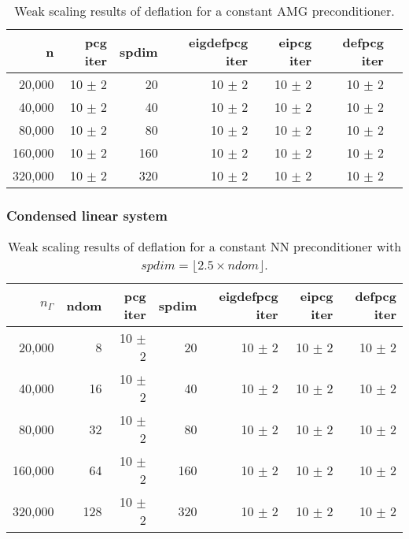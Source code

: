 \documentclass{article}
\begin{document}
\begin{table}[ht]
	\caption{Weak scaling results of deflation for a constant AMG preconditioner.}
	\centering
	\begin{tabular}{|r|r|r|r|r|r|r|}
		\hline
		n & pcg iter & spdim & eigdefpcg iter & eipcg iter & defpcg iter\\
		\hline
		20,000  &  10 $\pm$ 2 & 20 & 10 $\pm$ 2 & 10 $\pm$ 2 & 10 $\pm$ 2 \\
		40,000  & 10 $\pm$ 2 & 40 & 10 $\pm$ 2 & 10 $\pm$ 2 & 10 $\pm$ 2 \\
		80,000  & 10 $\pm$ 2 & 80 & 10 $\pm$ 2 & 10 $\pm$ 2 & 10 $\pm$ 2 \\
		160,000 & 10 $\pm$ 2 & 160 & 10 $\pm$ 2 & 10 $\pm$ 2 & 10 $\pm$ 2 \\
		320,000 & 10 $\pm$ 2 & 320 & 10 $\pm$ 2 & 10 $\pm$ 2 & 10 $\pm$ 2 \\
		\hline
	\end{tabular}
	\label{Tab:020}
\end{table}

\subsubsection{Condensed linear system}

\begin{table}[ht]
	\caption{Weak scaling results of deflation for a constant NN preconditioner with $spdim=\lfloor 2.5 \times ndom\rfloor$.}
	\centering
	\begin{tabular}{|r|r|r|r|r|r|r|}
		\hline
		$n_\Gamma$ & ndom & pcg iter & spdim & eigdefpcg iter & eipcg iter & defpcg iter\\
		\hline
		20,000  &   8 & 10 $\pm$ 2 & 20 & 10 $\pm$ 2 & 10 $\pm$ 2 & 10 $\pm$ 2 \\
		40,000  &  16 & 10 $\pm$ 2 & 40 & 10 $\pm$ 2 & 10 $\pm$ 2 & 10 $\pm$ 2 \\
		80,000  &  32 & 10 $\pm$ 2 & 80 & 10 $\pm$ 2 & 10 $\pm$ 2 & 10 $\pm$ 2 \\
		160,000 &  64 & 10 $\pm$ 2 & 160 & 10 $\pm$ 2 & 10 $\pm$ 2 & 10 $\pm$ 2 \\
		320,000 & 128 & 10 $\pm$ 2 & 320 & 10 $\pm$ 2 & 10 $\pm$ 2 & 10 $\pm$ 2 \\
		\hline
	\end{tabular}
	\label{Tab:025}
\end{table}
\end{document}
